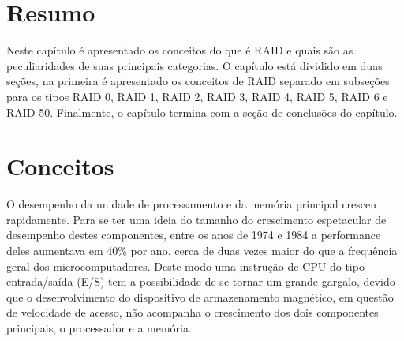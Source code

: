 \section{Resumo}
Neste capítulo é apresentado os conceitos do que é RAID e quais são as peculiaridades de suas principais categorias. O capítulo está dividido em duas seções, na primeira é apresentado os conceitos de RAID separado em subseções para os tipos RAID 0, RAID 1, RAID 2, RAID 3, RAID 4, RAID 5, RAID 6 e RAID 50. Finalmente, o capítulo termina com a seção de conclusões do capítulo.

		\section{Conceitos}
		O desempenho da unidade de processamento e da memória principal cresceu rapidamente. Para se ter uma ideia do tamanho do crescimento espetacular de desempenho destes componentes, entre os anos de 1974 e 1984 a performance deles aumentava em 40\% por ano, cerca de duas vezes maior do que a frequência geral dos microcomputadores. Deste modo uma instrução de CPU do tipo entrada/saída (E/S) tem a possibilidade de se tornar um grande gargalo, devido que o desenvolvimento do dispositivo de armazenamento magnético, em questão de velocidade de acesso, não acompanha o crescimento dos dois componentes principais, o processador e a memória.\\
		
